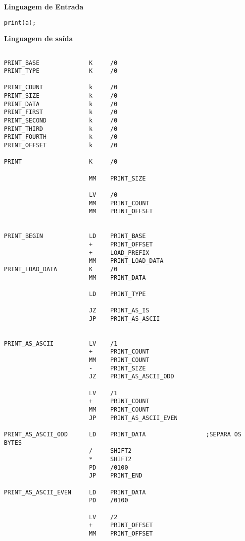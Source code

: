 \textbf{Linguagem de Entrada}\\

\begin{lstlisting}
print(a);
\end{lstlisting}

\textbf{Linguagem de saída} \\

\begin{lstlisting}

PRINT_BASE              K     /0
PRINT_TYPE              K     /0

PRINT_COUNT             k     /0
PRINT_SIZE              k     /0
PRINT_DATA              k     /0
PRINT_FIRST             k     /0
PRINT_SECOND            k     /0
PRINT_THIRD             k     /0
PRINT_FOURTH            k     /0
PRINT_OFFSET            k     /0

PRINT                   K     /0
                        
                        MM    PRINT_SIZE

                        LV    /0
                        MM    PRINT_COUNT
                        MM    PRINT_OFFSET


PRINT_BEGIN             LD    PRINT_BASE
                        +     PRINT_OFFSET
                        +     LOAD_PREFIX
                        MM    PRINT_LOAD_DATA
PRINT_LOAD_DATA         K     /0
                        MM    PRINT_DATA

                        LD    PRINT_TYPE

                        JZ    PRINT_AS_IS
                        JP    PRINT_AS_ASCII


PRINT_AS_ASCII          LV    /1
                        +     PRINT_COUNT
                        MM    PRINT_COUNT
                        -     PRINT_SIZE
                        JZ    PRINT_AS_ASCII_ODD

                        LV    /1
                        +     PRINT_COUNT
                        MM    PRINT_COUNT
                        JP    PRINT_AS_ASCII_EVEN

PRINT_AS_ASCII_ODD      LD    PRINT_DATA                 ;SEPARA OS BYTES
                        /     SHIFT2
                        *     SHIFT2
                        PD    /0100
                        JP    PRINT_END

PRINT_AS_ASCII_EVEN     LD    PRINT_DATA
                        PD    /0100

                        LV    /2
                        +     PRINT_OFFSET
                        MM    PRINT_OFFSET


\end{lstlisting}
